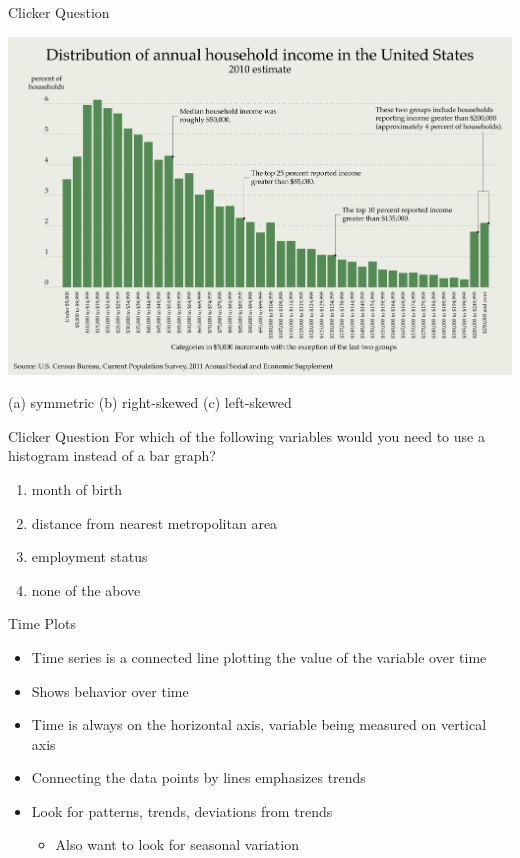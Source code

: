 \documentclass{beamer}
\begin{document}
\begin{frame}{Clicker Question}
    \begin{center}
        \includegraphics[width= 0.9\linewidth]{household_income.png}
    \end{center}

    (a) symmetric (b) right-skewed (c) left-skewed
\end{frame}

\begin{frame}{Clicker Question}
    For which of the following variables would you need to use a histogram instead of a bar graph?

    \begin{enumerate}[label=(\alph*)]
        \item month of birth
        \item distance from nearest metropolitan area
        \item employment status
        \item none of the above
    \end{enumerate}
\end{frame}

\begin{frame}{Time Plots}
    \begin{itemize}
        \item \alert{Time series} is a connected line plotting the value of the variable over time
        \item Shows behavior over time
        \item Time is always on the horizontal axis, variable being measured on vertical axis
        \item Connecting the data points by lines emphasizes trends
        \item Look for patterns, trends, deviations from trends
        \begin{itemize}
            \item Also want to look for seasonal variation
        \end{itemize}
    \end{itemize}
 
\end{frame}
    
\end{document}
